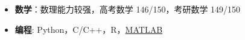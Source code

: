   \begin{itemize}[leftmargin=*]
    \item \textbf{数学}：数理能力较强，高考数学 146/150，考研数学 149/150
    \item \textbf{编程}: Python，C/C++，R，\href{https://www.mathworks.com/}{MATLAB}
  \end{itemize}